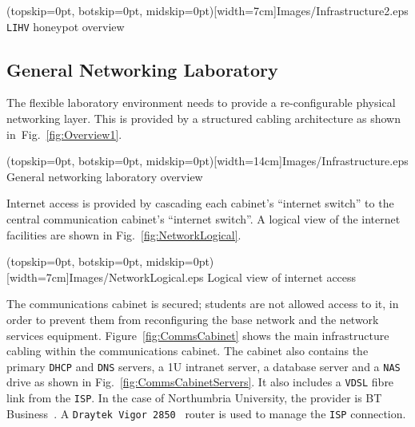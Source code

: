 \documentclass{ieeeaccess}
\begin{document}
\Figure[t!](topskip=0pt, botskip=0pt, midskip=0pt)[width=7cm]{Images/Infrastructure2.eps}
{\texttt{LIHV} honeypot overview\label{fig:Overview2}}


\subsection{General Networking Laboratory}

The flexible laboratory environment needs to provide a re-configurable physical
networking layer. This is provided by a structured cabling architecture as
shown in~Fig.~\ref{fig:Overview1}. 

\Figure[t!](topskip=0pt, botskip=0pt, midskip=0pt)[width=14cm]{Images/Infrastructure.eps}
{General networking laboratory overview\label{fig:Overview1}}


Internet access is provided by cascading each cabinet's ``internet switch'' to the central communication cabinet's ``internet switch''. A logical view of the internet facilities are shown in Fig.~\ref{fig:NetworkLogical}.

\Figure[t!](topskip=0pt, botskip=0pt, midskip=0pt)[width=7cm]{Images/NetworkLogical.eps}
{Logical view of internet access\label{fig:NetworkLogical}}


The communications cabinet is secured; students are not allowed access to it,
in order to prevent them from reconfiguring the base network and the network
services equipment. Figure~\ref{fig:CommsCabinet} shows the main infrastructure cabling within the communications cabinet.  The cabinet also contains the primary \texttt{DHCP} and
\texttt{DNS} servers, a 1U intranet server, a database server and a
\texttt{NAS} drive as shown in Fig.~\ref{fig:CommsCabinetServers}. It also includes a \texttt{VDSL} fibre link from the \texttt{ISP}. In the case of Northumbria University, the provider is BT
Business~\cite{BT:17}. A \texttt{Draytek Vigor 2850}~\cite{DC:17} router is used to
manage the \texttt{ISP} connection. 
\end{document}
